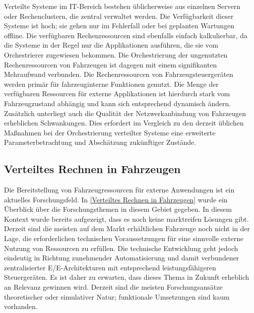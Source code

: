 Verteilte Systeme im IT-Bereich bestehen üblicherweise aus einzelnen Servern oder Rechenclustern, die zentral verwaltet werden. Die Verfügbarkeit dieser Systeme ist hoch; sie gehen nur im Fehlerfall oder bei geplanten Wartungen offline. Die verfügbaren Rechenressourcen sind ebenfalls einfach kalkulierbar, da die Systeme in der Regel nur die Applikationen ausführen, die sie vom Orchestrierer zugewiesen bekommen. Die Orchestrierung der ungenutzten Rechenressourcen von Fahrzeugen ist dagegen mit einem signifikanten Mehraufwand verbunden. Die Rechenressourcen von Fahrzeugsteuergeräten werden primär für fahrzeuginterne Funktionen genutzt. Die Menge der verfügbaren Ressourcen für externe Applikationen ist hierdurch stark vom Fahrzeugzustand abhängig und kann sich entsprechend dynamisch ändern. Zusätzlich unterliegt auch die Qualität der Netzwerkanbindung von Fahrzeugen erheblichen Schwankungen. Dies erfordert im Vergleich zu den derzeit üblichen Maßnahmen bei der Orchestrierung verteilter Systeme eine erweiterte Parameterbetrachtung und Abschätzung zukünftiger Zustände.

\subsection{Verteiltes Rechnen in Fahrzeugen}
Die Bereitstellung von Fahrzeugressourcen für externe Anwendungen ist ein aktuelles Forschungsfeld. In \autoref{Verteiltes Rechnen in Fahrzeugen} wurde ein Überblick über die Forschungsthemen in diesem Gebiet gegeben. In diesem Kontext wurde bereits aufgezeigt, dass es noch keine marktreifen Lösungen gibt. Derzeit sind die meisten auf dem Markt erhältlichen Fahrzeuge noch nicht in der Lage, die erforderlichen technischen Voraussetzungen für eine sinnvolle externe Nutzung von Ressourcen zu erfüllen. Die technische Entwicklung geht jedoch eindeutig in Richtung zunehmender Automatisierung und damit verbundener zentralisierter E/E-Architekturen mit entsprechend leistungsfähigeren Steuergeräten. Es ist daher zu erwarten, dass dieses Thema in Zukunft erheblich an Relevanz gewinnen wird. Derzeit sind die meisten Forschungsansätze theoretischer oder simulativer Natur; funktionale Umsetzungen sind kaum vorhanden.

